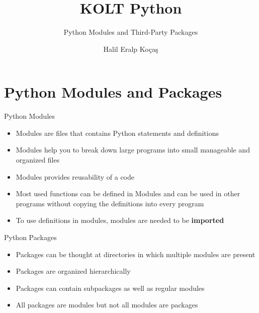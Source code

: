 
\usepackage{../KU-Beamer-Template/style/koc} 
\usepackage{minted}
\usepackage{upquote}
\usepackage{graphicx}

\title{KOLT Python}
\subtitle{Python Modules and Third-Party Packages} 
\date{}
\author{Halil Eralp Koçaş}




    \maketitle


    \section{Python Modules and Packages}
    
    \begin{frame}{Python Modules}
        \LARGE
        \begin{itemize}
            \item Modules are files that contains Python statements and definitions
            \pause
            \item Modules help you to break down large programs into small manageable and organized files
            \pause
            \item Modules provides reusability of a code
            \pause
            \item Most used functions can be defined in Modules and can be used in other programs without copying the definitions into every program
            \pause
            \item To use definitions in modules, modules are needed to be \textbf{imported}
        \end{itemize}
    \end{frame}
     
    \begin{frame}{Python Packages}
        \LARGE
        \begin{itemize}
            \item Packages can be thought at directories in which multiple modules are present
            \pause
            \item Packages are organized hierarchically
            \pause
            \item Packages can contain subpackages as well as regular modules
            \pause
            \item All packages are modules but not all modules are packages
            
        \end{itemize}
    \end{frame}

